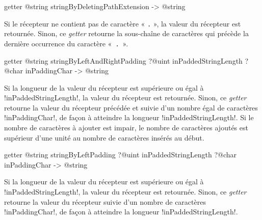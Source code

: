 
\begin{galgas3box}
getter @string stringByDeletingPathExtension -> @string
\end{galgas3box}

Si le récepteur ne contient pas de caractère « \texttt{.} », la valeur du récepteur est retournée. Sinon, ce \emph{getter} retourne la sous-chaîne de caractères qui précède la dernière occurrence du caractère «~\texttt{.}~».









\begin{galgas3box}
getter @string stringByLeftAndRightPadding
   ?@uint inPaddedStringLength
   ?@char inPaddingChar -> @string
\end{galgas3box}

Si la longueur de la valeur du récepteur est supérieure ou égal à \ggst!inPaddedStringLength!, la valeur du récepteur est retournée. Sinon, ce \emph{getter} retourne la valeur du récepteur précédée et suivie d'un nombre égal de caractères \ggst!inPaddingChar!, de façon à atteindre la longueur \ggst!inPaddedStringLength!. Si le nombre de caractères à ajouter est impair, le nombre de caractères ajoutés est supérieur d'une unité au nombre de caractères insérés au début.









\begin{galgas3box}
getter @string stringByLeftPadding
   ?@uint inPaddedStringLength
   ?@char inPaddingChar -> @string
\end{galgas3box}

Si la longueur de la valeur du récepteur est supérieure ou égal à \ggst!inPaddedStringLength!, la valeur du récepteur est retournée. Sinon, ce \emph{getter} retourne la valeur du récepteur suivie d'un nombre de caractères \ggst!inPaddingChar!, de façon à atteindre la longueur \ggst!inPaddedStringLength!.








